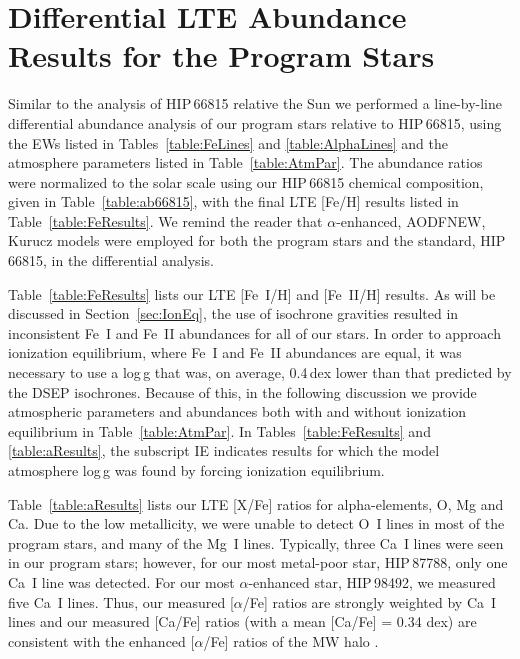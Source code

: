 \documentclass[revtex4]{emulateapj}
\begin{document}
\section{Differential LTE Abundance Results for the Program Stars}\label{sec:DiffAbund}
Similar to the analysis of HIP\,66815 relative the Sun we performed a line-by-line differential abundance analysis of our program stars relative to HIP\,66815, using the EWs listed in Tables~\ref{table:FeLines} and \ref{table:AlphaLines} and the atmosphere parameters listed in Table~\ref{table:AtmPar}. The abundance ratios were normalized to the solar scale using our HIP\,66815 chemical composition, given in Table~\ref{table:ab66815}, with the final LTE [Fe/H] results listed in Table~\ref{table:FeResults}.  We remind the reader that $\alpha$-enhanced, AODFNEW, Kurucz models were employed for both the program stars and the standard, HIP\,66815, in the differential analysis.

Table~\ref{table:FeResults} lists our LTE [Fe~I/H] and [Fe~II/H] results.  As will be discussed in Section~\ref{sec:IonEq}, the use of isochrone gravities resulted in inconsistent Fe~I and Fe~II abundances for all of our stars.  In order to approach ionization equilibrium, where Fe~I and Fe~II abundances are equal, it was necessary to use a log\,g that was, on average, 0.4\,dex lower than that predicted by the DSEP isochrones.  Because of this, in the following discussion we provide atmospheric parameters and abundances both with and without ionization equilibrium in Table~\ref{table:AtmPar}.  In Tables~\ref{table:FeResults} and \ref{table:aResults}, the subscript IE indicates results for which the model atmosphere log\,g was found by forcing ionization equilibrium.

Table~\ref{table:aResults} lists our LTE [X/Fe] ratios for alpha-elements, O, Mg and Ca.  Due to the low metallicity, we were unable to detect O~I lines in most of the program stars, and many of the Mg~I lines.  Typically, three Ca~I lines were seen in our program stars; however, for our most metal-poor star, HIP\,87788, only one Ca~I line was detected.  For our most $\alpha$-enhanced star, HIP\,98492, we measured five Ca~I lines.  Thus, our measured [$\alpha$/Fe] ratios are strongly weighted by Ca~I lines and our measured [Ca/Fe] ratios (with a mean [Ca/Fe] = 0.34 dex) are consistent with the enhanced [$\alpha$/Fe] ratios of the MW halo \citep[and references therein]{Sneden2004}.
\end{document}
